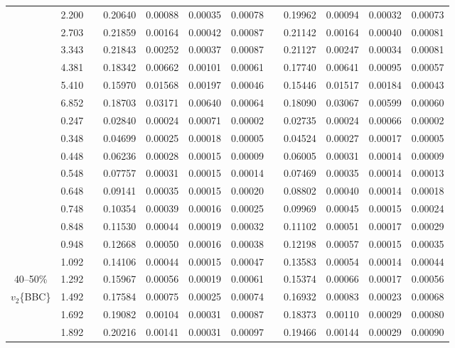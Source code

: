 \documentclass[aps,prc,superscriptaddress,showpacs,floatfix,twocolumn]{revtex4}
\begin{document}
\begin{table}[htbp]
\begin{ruledtabular}
\begin{tabular}{c|ccccccccccc}
 & 2.200 && 0.20640 & 0.00088 & 0.00035 & 0.00078 & & 0.19962 & 0.00094 & 0.00032 & 0.00073 \\ 
 & 2.703 && 0.21859 & 0.00164 & 0.00042 & 0.00087 & & 0.21142 & 0.00164 & 0.00040 & 0.00081 \\ 
 & 3.343 && 0.21843 & 0.00252 & 0.00037 & 0.00087 & & 0.21127 & 0.00247 & 0.00034 & 0.00081 \\ 
 & 4.381 && 0.18342 & 0.00662 & 0.00101 & 0.00061 & & 0.17740 & 0.00641 & 0.00095 & 0.00057 \\ 
 & 5.410 && 0.15970 & 0.01568 & 0.00197 & 0.00046 & & 0.15446 & 0.01517 & 0.00184 & 0.00043 \\ 
 & 6.852 && 0.18703 & 0.03171 & 0.00640 & 0.00064 & & 0.18090 & 0.03067 & 0.00599 & 0.00060 \\ 
\hline 
 & 0.247 && 0.02840 & 0.00024 & 0.00071 & 0.00002 & & 0.02735 & 0.00024 & 0.00066 & 0.00002 \\ 
 & 0.348 && 0.04699 & 0.00025 & 0.00018 & 0.00005 & & 0.04524 & 0.00027 & 0.00017 & 0.00005 \\ 
 & 0.448 && 0.06236 & 0.00028 & 0.00015 & 0.00009 & & 0.06005 & 0.00031 & 0.00014 & 0.00009 \\ 
 & 0.548 && 0.07757 & 0.00031 & 0.00015 & 0.00014 & & 0.07469 & 0.00035 & 0.00014 & 0.00013 \\ 
 & 0.648 && 0.09141 & 0.00035 & 0.00015 & 0.00020 & & 0.08802 & 0.00040 & 0.00014 & 0.00018 \\ 
 & 0.748 && 0.10354 & 0.00039 & 0.00016 & 0.00025 & & 0.09969 & 0.00045 & 0.00015 & 0.00024 \\ 
 & 0.848 && 0.11530 & 0.00044 & 0.00019 & 0.00032 & & 0.11102 & 0.00051 & 0.00017 & 0.00029 \\ 
 & 0.948 && 0.12668 & 0.00050 & 0.00016 & 0.00038 & & 0.12198 & 0.00057 & 0.00015 & 0.00035 \\ 
 & 1.092 && 0.14106 & 0.00044 & 0.00015 & 0.00047 & & 0.13583 & 0.00054 & 0.00014 & 0.00044 \\ 
40--50\%
 & 1.292 && 0.15967 & 0.00056 & 0.00019 & 0.00061 & & 0.15374 & 0.00066 & 0.00017 & 0.00056 \\ 
$v_2$\{BBC\}
 & 1.492 && 0.17584 & 0.00075 & 0.00025 & 0.00074 & & 0.16932 & 0.00083 & 0.00023 & 0.00068 \\ 
 & 1.692 && 0.19082 & 0.00104 & 0.00031 & 0.00087 & & 0.18373 & 0.00110 & 0.00029 & 0.00080 \\ 
 & 1.892 && 0.20216 & 0.00141 & 0.00031 & 0.00097 & & 0.19466 & 0.00144 & 0.00029 & 0.00090 \\ 

\end{tabular}
\end{ruledtabular}
\end{table}
\end{document}
